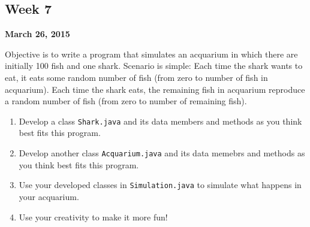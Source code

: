 \documentclass[12pt,letterpaper,twoside]{article}
\begin{document}


\subsection*{Week 7}
\hfill \textbf{March 26, 2015}

Objective is to write a program that simulates an acquarium in which there are initially 100 fish and one shark. Scenario is simple: Each time the shark wants to eat, it eats some random number of fish (from zero to number of fish in acquarium). Each time the shark eats, the remaining fish in acquarium reproduce a random number of fish (from zero to number of remaining fish).
\begin{enumerate}[itemsep=0pt]
\item Develop a class \texttt{Shark.java} and its data members and methods as you think best fits this program.
\item Develop another class \texttt{Acquarium.java} and its data memebrs and methods as you think best fits this program.
\item Use your developed classes in \texttt{Simulation.java} to simulate what happens in your acquarium.
\item Use your creativity to make it more fun!
\end{enumerate}
\end{document}
